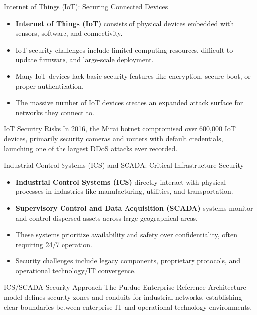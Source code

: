 \documentclass{beamer}
\begin{document}
\begin{frame}{Internet of Things (IoT): Securing Connected Devices}
\begin{itemize}
\item \textbf{Internet of Things (IoT)} consists of physical devices embedded with sensors, software, and connectivity.
\item IoT security challenges include limited computing resources, difficult-to-update firmware, and large-scale deployment.
\item Many IoT devices lack basic security features like encryption, secure boot, or proper authentication.
\item The massive number of IoT devices creates an expanded attack surface for networks they connect to.
\end{itemize}

\begin{alertblock}{IoT Security Risks}
In 2016, the Mirai botnet compromised over 600,000 IoT devices, primarily security cameras and routers with default credentials, launching one of the largest DDoS attacks ever recorded.
\end{alertblock}
\end{frame}

\begin{frame}{Industrial Control Systems (ICS) and SCADA: Critical Infrastructure Security}
\begin{itemize}
\item \textbf{Industrial Control Systems (ICS)} directly interact with physical processes in industries like manufacturing, utilities, and transportation.
\item \textbf{Supervisory Control and Data Acquisition (SCADA)} systems monitor and control dispersed assets across large geographical areas.
\item These systems prioritize availability and safety over confidentiality, often requiring 24/7 operation.
\item Security challenges include legacy components, proprietary protocols, and operational technology/IT convergence.
\end{itemize}

\begin{exampleblock}{ICS/SCADA Security Approach}
The Purdue Enterprise Reference Architecture model defines security zones and conduits for industrial networks, establishing clear boundaries between enterprise IT and operational technology environments.
\end{exampleblock}
\end{frame}
\end{document}
